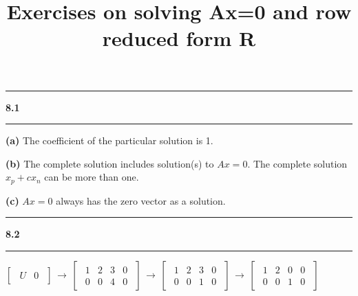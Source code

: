 \documentclass[11pt]{article}
\newcommand\question[2]{\vspace{.25in}\hrule\textbf{#1 #2}\vspace{.5em}\hrule\vspace{.10in}}
\renewcommand\part[1]{\vspace{.10in}\textbf{(#1)}}
\begin{document}
\raggedright
\newcommand\NAME{Haiying Cui}  %
\newcommand\ANDREWID{Christy}     %
\newcommand\HWNUM{8}              %

\title{Exercises on solving Ax=0 and row reduced form R}
\maketitle

\question{8.1}{}
\part{a} The coefficient of the particular solution is 1.

\part{b} The complete solution includes solution(s) to \(Ax = 0\). The complete solution \(x_p + cx_n \) can be more than one.

\part{c} \(Ax = 0\) always has the zero vector as a solution.

\question{8.2}{}
\(\begin{bmatrix}\begin{array}{c|c} U & 0 \end{array}\end{bmatrix}\,\to\,\begin{bmatrix}\begin{array}{ccc|c} 1&2&3&0 \\ 0&0&4&0 \end{array}\end{bmatrix}\,\to\,\begin{bmatrix}\begin{array}{ccc|c} 1&2&3&0 \\ 0&0&1&0 \end{array}\end{bmatrix}\,\to\,\begin{bmatrix}\begin{array}{ccc|c} 1&2&0&0 \\ 0&0&1&0 \end{array}\end{bmatrix}\)
\end{document}
